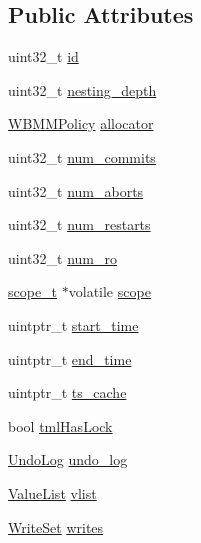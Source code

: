 \subsection*{Public Attributes}
\begin{DoxyCompactItemize}
\item 
uint32\-\_\-t \hyperlink{structstm_1_1TxThread_a7dcef0ff441ee308959e70313622f1ca}{id}
\item 
uint32\-\_\-t \hyperlink{structstm_1_1TxThread_a1fa5c40b4b2ce82ad3f31c6a48b51472}{nesting\-\_\-depth}
\item 
\hyperlink{classstm_1_1WBMMPolicy}{W\-B\-M\-M\-Policy} \hyperlink{structstm_1_1TxThread_a7c2db35e64ece71ff1622c863fef9b25}{allocator}
\item 
uint32\-\_\-t \hyperlink{structstm_1_1TxThread_a069d677bd932889c7abec4f684d984e4}{num\-\_\-commits}
\item 
uint32\-\_\-t \hyperlink{structstm_1_1TxThread_af77ac9d0a0e20e012bfaca3a883f9d5b}{num\-\_\-aborts}
\item 
uint32\-\_\-t \hyperlink{structstm_1_1TxThread_af5fc22390df66268ad23d701153e40f2}{num\-\_\-restarts}
\item 
uint32\-\_\-t \hyperlink{structstm_1_1TxThread_a43b41a7888b7ba9d2acd18127422c036}{num\-\_\-ro}
\item 
\hyperlink{namespacestm_a91badf88c88aacc831b01a315435a255}{scope\-\_\-t} $\ast$volatile \hyperlink{structstm_1_1TxThread_a3b88d6c91b301b5d4ff8c3ac826018ac}{scope}
\item 
uintptr\-\_\-t \hyperlink{structstm_1_1TxThread_a6fe8a3d6580bcbb43f2ddad98130f542}{start\-\_\-time}
\item 
uintptr\-\_\-t \hyperlink{structstm_1_1TxThread_af3302e5a541e22a3af3176c01f60ffc3}{end\-\_\-time}
\item 
uintptr\-\_\-t \hyperlink{structstm_1_1TxThread_aa2a246af5aece9c002ca5968505a9d6f}{ts\-\_\-cache}
\item 
bool \hyperlink{structstm_1_1TxThread_aa9915dd0831b64f59ef287810312787b}{tml\-Has\-Lock}
\item 
\hyperlink{classstm_1_1UndoLog}{Undo\-Log} \hyperlink{structstm_1_1TxThread_afddcc03d014798b970c8a18f5c94588d}{undo\-\_\-log}
\item 
\hyperlink{structstm_1_1ValueList}{Value\-List} \hyperlink{structstm_1_1TxThread_ab0a99f4dabcc76bb13511826b5ca17b0}{vlist}
\item 
\hyperlink{classstm_1_1WriteSet}{Write\-Set} \hyperlink{structstm_1_1TxThread_ab70bb974af78d5b89b57f08c93ec43ef}{writes}
\item 

\end{DoxyCompactItemize}
